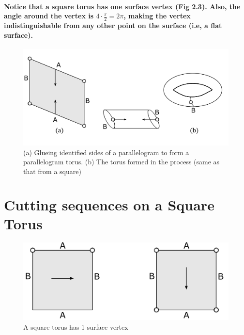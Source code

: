 \documentclass{report}
\begin{document}
\paragraph{Notice that a square torus has one surface vertex (Fig 2.3). Also, the angle around the vertex is $4\cdot\frac{\pi}{2} = 2\pi$, making the vertex indistinguishable from any other point on the surface (i.e, a flat surface).}


\begin{figure}[h] 
\begin{center}
\includegraphics[scale=0.3]{2.2}
\caption{(a) Glueing identified sides of a parallelogram to form a parallelogram torus. (b) The torus formed in the process (same as that from a square)}
\end{center}
\end{figure}


\section{Cutting sequences on a Square Torus}


\begin{figure} 
\begin{center}
\includegraphics[scale=0.3]{2.3}
\caption{ A square torus has 1 surface vertex}
\end{center}
\end{figure}
\end{document}
